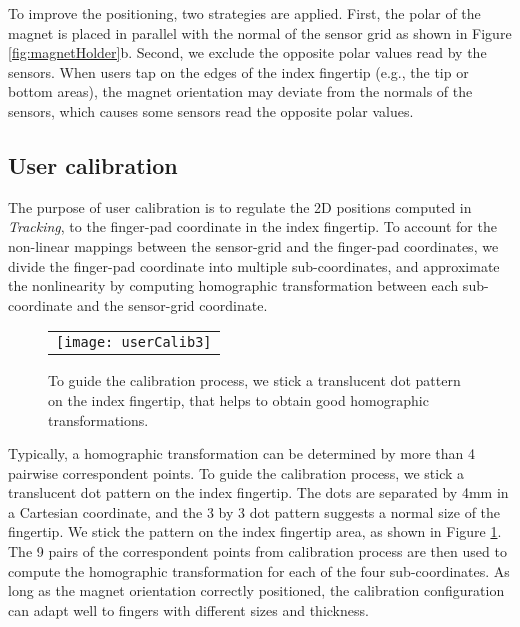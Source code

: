 To improve the positioning, two strategies are applied. 
First, the polar of the magnet is placed in parallel with the normal of the sensor grid as shown in Figure \ref{fig:magnetHolder}b.
Second, we exclude the opposite polar values read by the sensors. 
When users tap on the edges of the index fingertip (e.g., the tip or bottom areas), 
the magnet orientation may deviate from the normals of the sensors, which causes some sensors read the opposite polar values. %



\subsection{User calibration}
The purpose of user calibration is to regulate the 2D positions computed in \emph{Tracking}, to the finger-pad coordinate in the index fingertip.
To account for the non-linear mappings between the sensor-grid and the finger-pad coordinates, we divide the finger-pad coordinate into multiple sub-coordinates, and approximate the nonlinearity by computing homographic transformation between each sub-coordinate and the sensor-grid coordinate. 

\begin{figure}
\begin{center}
  \begin{tabular}{@{\hspace{0.1cm}}c}
		\texttt{[image: userCalib3]}\\
   \end{tabular}
\caption{To guide the calibration process, we stick a translucent dot pattern on the index fingertip, that helps to obtain good homographic transformations.}
\label{fig:userCalib}
\end{center}
\end{figure}

Typically, a homographic transformation can be determined by more than 4 pairwise correspondent points. 
To guide the calibration process, we stick a translucent dot pattern on the index fingertip. 
The dots are separated by 4mm in a Cartesian coordinate, and the 3 by 3 dot pattern suggests a normal size of the fingertip. 
We stick the pattern on the index fingertip area, as shown in Figure \ref{fig:userCalib}. 
The 9 pairs of the correspondent points from calibration process are then used to compute the homographic transformation for each of the four sub-coordinates. 
As long as the magnet orientation correctly positioned, the calibration configuration can adapt well to fingers with different sizes and thickness.

